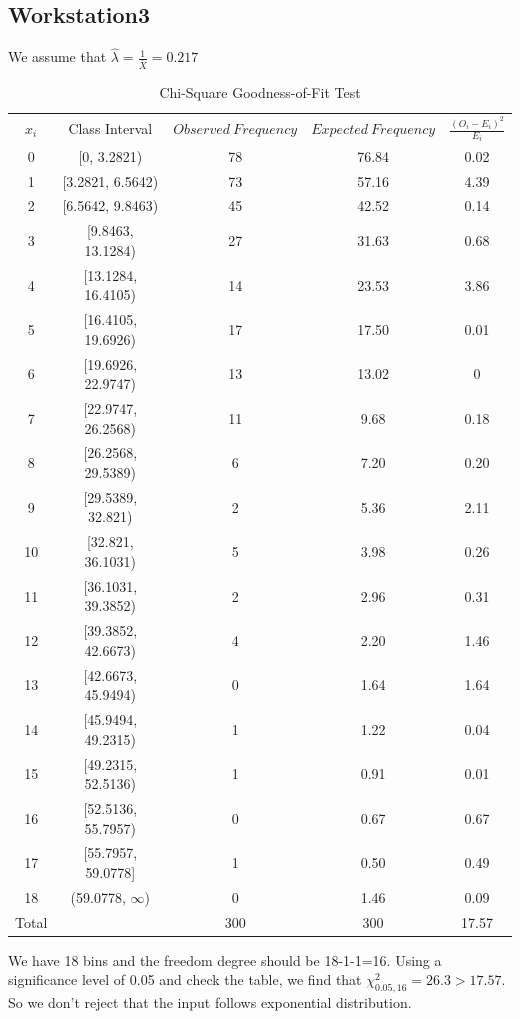 \documentclass{article}
\begin{document}
\subsection{Workstation3}

We assume that $\hat{\lambda}=\frac{1}{\bar{X}}=0.217$
\begin{table}[htp]
\caption{Chi-Square Goodness-of-Fit Test}
\begin{center}
\begin{tabular}{ccccc}
\hline
$x_i$ & Class Interval & $Observed\ Frequency$ & $Expected\ Frequency$ & $\frac{(O_i-E_i)^2}{E_i}$\\
0&[0, 3.2821)&78&76.84&0.02\\
1&[3.2821, 6.5642)&73&57.16&4.39\\
2&[6.5642, 9.8463)&45&42.52&0.14\\
3&[9.8463, 13.1284)&27&31.63&0.68\\
4&[13.1284, 16.4105)&14&23.53&3.86\\
5&[16.4105, 19.6926)&17&17.50&0.01\\
6&[19.6926, 22.9747)&13&13.02&0\\
7&[22.9747, 26.2568)&11&9.68&0.18\\
8&[26.2568, 29.5389)&6&7.20&0.20\\
9&[29.5389, 32.821)&2&5.36&2.11\\
10&[32.821, 36.1031)&5&3.98&0.26\\
11&[36.1031, 39.3852)&2&2.96&0.31\\
12&[39.3852, 42.6673)&4&2.20&1.46\\
13&[42.6673, 45.9494)&0&1.64&1.64\\
14&[45.9494, 49.2315)&1&1.22&0.04\\
15&[49.2315, 52.5136)&1&0.91&0.01\\
16&[52.5136, 55.7957)&0&0.67&0.67\\
17&[55.7957, 59.0778]&1&0.50&0.49\\
18&(59.0778, $\infty$)&0&1.46&0.09\\
\hline
Total& &300&300&17.57\\

\hline

\end{tabular}
\end{center}
\label{default}
\end{table}%

We have 18 bins and the freedom degree should be 18-1-1=16. Using a significance level of 0.05 and check the table, we find that $\chi^2_{0.05, 16}=26.3 > 17.57$. So we don't reject that the input follows exponential distribution.
\end{document}
